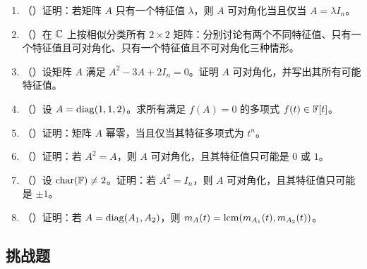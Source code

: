 \begin{enumerate}[label=\arabic*., leftmargin=2.8em, resume]
  \item （\medium）证明：若矩阵 \(A\) 只有一个特征值 \(\lambda\)，则 \(A\) 可对角化当且仅当 \(A=\lambda I_n\)。
  \item （\medium）在 \(\mathbb{C}\) 上按相似分类所有 \(2\times 2\) 矩阵：分别讨论有两个不同特征值、只有一个特征值且可对角化、只有一个特征值且不可对角化三种情形。
  \item （\medium）设矩阵 \(A\) 满足 \(A^2-3A+2I_n=0\)。证明 \(A\) 可对角化，并写出其所有可能特征值。
  \item （\medium）设 \(A=\mathrm{diag}(1,1,2)\)。求所有满足 \(f(A)=0\) 的多项式 \(f(t)\in \mathbb{F}[t]\)。
  \item （\medium）证明：矩阵 \(A\) 幂零，当且仅当其特征多项式为 \(t^n\)。
  \item （\medium）证明：若 \(A^2=A\)，则 \(A\) 可对角化，且其特征值只可能是 \(0\) 或 \(1\)。
  \item （\medium）设 \(\mathrm{char}(\mathbb{F})\neq 2\)。证明：若 \(A^2=I_n\)，则 \(A\) 可对角化，且其特征值只可能是 \(\pm 1\)。
  \item （\medium）证明：若 \(A=\mathrm{diag}(A_1,A_2)\)，则 \(m_A(t)=\operatorname{lcm}(m_{A_1}(t),m_{A_2}(t))\)。
\end{enumerate}

\subsection*{挑战题}

